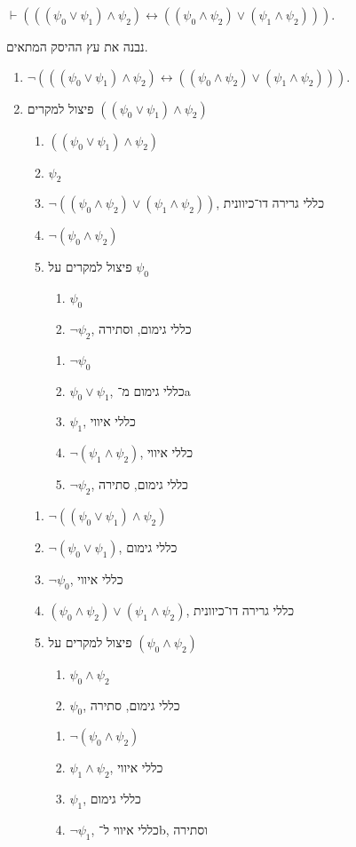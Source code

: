 \subquestion{}
$\vdash (((\psi_0 \lor \psi_1) \land \psi_2) \leftrightarrow ((\psi_0 \land \psi_2) \lor (\psi_1 \land \psi_2)))$.
\begin{solution}
	נבנה את עץ ההיסק המתאים.
	\begin{enumerate}
		\item $\lnot (((\psi_0 \lor \psi_1) \land \psi_2) \leftrightarrow ((\psi_0 \land \psi_2) \lor (\psi_1 \land \psi_2)))$.
		\item פיצול למקרים $((\psi_0 \lor \psi_1) \land \psi_2)$
			\begin{enumerate}
				\item $((\psi_0 \lor \psi_1) \land \psi_2)$
				\item $\psi_2$
				\item $\lnot ((\psi_0 \land \psi_2) \lor (\psi_1 \land \psi_2))$, כללי גרירה דו־כיוונית
				\item $\lnot (\psi_0 \land \psi_2)$
				\item פיצול למקרים על $\psi_0$
					\begin{enumerate}
						\item $\psi_0$
						\item $\lnot \psi_2$, כללי גימום, וסתירה
					\end{enumerate}
					\begin{enumerate}
						\item $\lnot \psi_0$
						\item $\psi_0 \lor \psi_1$, כללי גימום מ־a
						\item $\psi_1$, כללי איווי
						\item $\lnot (\psi_1 \land \psi_2)$, כללי איווי
						\item $\lnot \psi_2$, כללי גימום, סתירה
					\end{enumerate}
			\end{enumerate}
			\begin{enumerate}
				\item $\lnot ((\psi_0 \lor \psi_1) \land \psi_2)$
				\item $\lnot (\psi_0 \lor \psi_1)$, כללי גימום
				\item $\lnot \psi_0$, כללי איווי
				\item $(\psi_0 \land \psi_2) \lor (\psi_1 \land \psi_2)$, כללי גרירה דו־כיוונית
				\item פיצול למקרים על $(\psi_0 \land \psi_2)$
					\begin{enumerate}
						\item $\psi_0 \land \psi_2$
						\item $\psi_0$, כללי גימום, סתירה
					\end{enumerate}
					\begin{enumerate}
						\item $\lnot (\psi_0 \land \psi_2)$
						\item $\psi_1 \land \psi_2$, כללי איווי
						\item $\psi_1$, כללי גימום
						\item $\lnot \psi_1$, כללי איווי ל־b, וסתירה
					\end{enumerate}
			\end{enumerate}
	\end{enumerate}
\end{solution}

